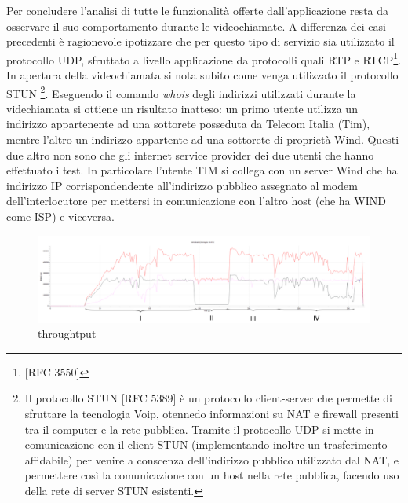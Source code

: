 \documentclass{article}
\begin{document}
    
    Per concludere l'analisi di tutte le funzionalità offerte dall'applicazione 
    resta da osservare il suo comportamento durante le videochiamate. A differenza dei casi precedenti è ragionevole 
    ipotizzare che per questo tipo di servizio sia utilizzato il protocollo UDP, sfruttato a livello applicazione 
    da protocolli quali RTP e RTCP\footnote{[RFC 3550]}.
    In apertura della videochiamata si nota subito come venga utilizzato il protocollo
    STUN \footnote{Il protocollo STUN [RFC 5389] è un protocollo client-server che permette
    di sfruttare la tecnologia Voip, otennedo informazioni su NAT e firewall
    presenti tra il computer e la rete pubblica. Tramite il protocollo UDP si mette in
    comunicazione con il client STUN (implementando inoltre un trasferimento affidabile) per
    venire a conscenza dell'indirizzo pubblico utilizzato dal NAT, e permettere così la 
    comunicazione con un host nella rete pubblica, facendo uso della rete di server STUN esistenti.}.
    Eseguendo il comando \textit{whois} degli indirizzi utilizzati durante la videchiamata si ottiene un 
    risultato inatteso:
    un primo utente utilizza un indirizzo appartenente ad una sottorete posseduta da Telecom Italia (Tim), 
    mentre l'altro un indirizzo appartente ad una sottorete di proprietà Wind. Questi due altro non sono che gli 
    internet service provider dei due utenti che hanno effettuato i test. In particolare l'utente TIM si collega con
    un server Wind che ha indirizzo IP corrispondendente all'indirizzo pubblico assegnato al modem
    dell'interlocutore 
    per mettersi in comunicazione con l'altro host (che ha WIND come ISP) e viceversa. \\
    
    
    \begin{figure}[h]
      \centering
      \includegraphics[width=1\textwidth]{chiamata.png}
      \caption{throughtput}\label{thr}
    \end{figure}
    
\end{document}
